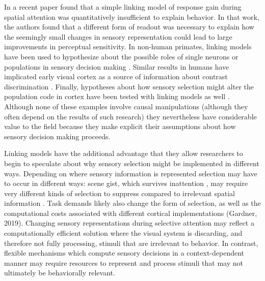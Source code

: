 In a recent paper \citet{Pestilli2011-gi} found that a simple linking model of response gain during spatial attention was quantitatively insufficient to explain behavior. In that work, the authors found that a different form of readout was necessary to explain how the seemingly small changes in sensory representation could lead to large improvements in perceptual sensitivity. In non-human primates, linking models have been used to hypothesize about the possible roles of single neurons or populations in sensory decision making \citep{Newsome1989-fr}. Similar results in humans have implicated early visual cortex as a source of information about contrast discrimination \citep{Boynton1999-jd}. Finally, hypotheses about how sensory selection might alter the population code in cortex have been tested with linking models as well \citep{Cohen2011-pa}. Although none of these examples involve causal manipulations (although they often depend on the results of such research) they nevertheless have considerable value to the field because they make explicit their assumptions about how sensory decision making proceeds.

Linking models have the additional advantage that they allow researchers to begin to speculate about why sensory selection might be implemented in different ways. Depending on where sensory information is represented selection may have to occur in different ways: scene gist, which survives inattention \citep{Li2002-ji,Peelen2009-us}, may require very different kinds of selection to suppress compared to irrelevant spatial information \citep{Pestilli2011-gi}. Task demands likely also change the form of selection, as well as the computational costs associated with different cortical implementations (Gardner, 2019). Changing sensory representations during selective attention may reflect a computationally efficient solution where the visual system is discarding, and therefore not fully processing, stimuli that are irrelevant to behavior. In contrast, flexible mechanisms which compute sensory decisions in a context-dependent manner \citep{Mante2013-tn} may require resources to represent and process stimuli that may not ultimately be behaviorally relevant. 

